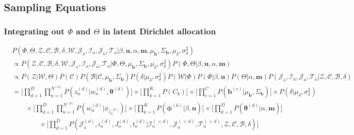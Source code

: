 \documentclass[a4paper]{article}
\begin{document}
  	  \subsection{Sampling Equations}\label{subsec:Sampling Equations}
  	   \iffalse
  	     \subsubsection{Integrating out $\Phi$ and $\Theta$ in latent Dirichlet allocation}\label{subsec: phitheta integration}
  	     \begin{equation*}
  	     \begin{aligned}
  	     &  P(\Phi, \Theta, \mathcal{Z}, \mathcal{C}, \mathcal{B}, \delta, \mathcal{W}, \mathcal{J}_{\mbox{a}}, \mathcal{I}_{\mbox{o}}, \mathcal{J}_{\mbox{o}}, \mathcal{T}_{\mbox{o}}| \beta, \boldsymbol{u}, \alpha, \boldsymbol{m}, \mu_{\boldsymbol{b}}, \Sigma_{\boldsymbol{b}}, \mu_\delta, \sigma^2_\delta) \\& 
  	     \propto P( \mathcal{Z}, \mathcal{C}, \mathcal{B},  \delta, \mathcal{W}, \mathcal{J}_{\mbox{a}}, \mathcal{I}_{\mbox{o}}, \mathcal{J}_{\mbox{o}}, \mathcal{T}_{\mbox{o}}|\Phi, \Theta, \mu_{\boldsymbol{b}}, \Sigma_{\boldsymbol{b}}, \mu_\delta, \sigma^2_\delta)P(\Phi, \Theta| \beta, \boldsymbol{u}, \alpha, \boldsymbol{m})
  	     \\& 
  	     \propto P(\mathcal{Z}|\mathcal{W},\Theta)P(\mathcal{C})P(\mathcal{B}|\mathcal{C}, \mu_{\boldsymbol{b}}, \Sigma_{\boldsymbol{b}})P(\delta|\mu_\delta, \sigma^2_\delta)P(\mathcal{W}|\Phi)P(\Phi| \beta, \boldsymbol{u})P(\Theta|\alpha, \boldsymbol{m})P(\mathcal{J}_{\mbox{a}}, \mathcal{I}_{\mbox{o}}, \mathcal{J}_{\mbox{o}}, \mathcal{T}_{\mbox{o}} |\mathcal{Z}, \mathcal{C}, \mathcal{B}, \delta)
  	     \\&=\Big[\prod_{d=1}^{D}\prod_{n=1}^{N^{(d)}} P( z_n^{(d)}|w_n^{(d)},  \boldsymbol{\theta}^{(d)})\Big]\times \Big[\prod_{k=1}^{K} P(C_k)\Big] \times\Big[\prod_{c=1}^{C} P( \boldsymbol{b}^{(c)}| \mu_{\boldsymbol{b}}, \Sigma_{\boldsymbol{b}})\Big] \times P(\delta|\mu_\delta, \sigma^2_\delta)\\&\quad \quad\times \Big[\prod_{d=1}^{D}\prod_{n=1}^{N^{(d)}} P(w_n^{(d)}| \phi_{z_n^{(d)}})\Big]\times \Big[\prod_{k=1}^{K} P( \boldsymbol{\phi}^{(k)}| \beta, \boldsymbol{u})\Big]\times \Big[\prod_{d=1}^{D} P( \boldsymbol{\theta}^{(d)}|\alpha, \boldsymbol{m})\Big]\\&\quad \quad\quad \quad\times\Big[\prod_{d=1}^{D} P(\mathcal{J}^{(d)}_{\mbox{a}}, i^{(d)}_{\mbox{o}}, J^{(d)}_{\mbox{o}}, t^{(d)}_{\mbox{o}} |\mathcal{I}^{(<d)}_{\mbox{o}}, \mathcal{J}^{(<d)}_{\mbox{o}}, \mathcal{T}^{(<d)}_{\mbox{o}},\mathcal{Z}, \mathcal{C}, \mathcal{B}, \delta)\Big] 
  	     \end{aligned}
  	     \end{equation*}
\end{document}
